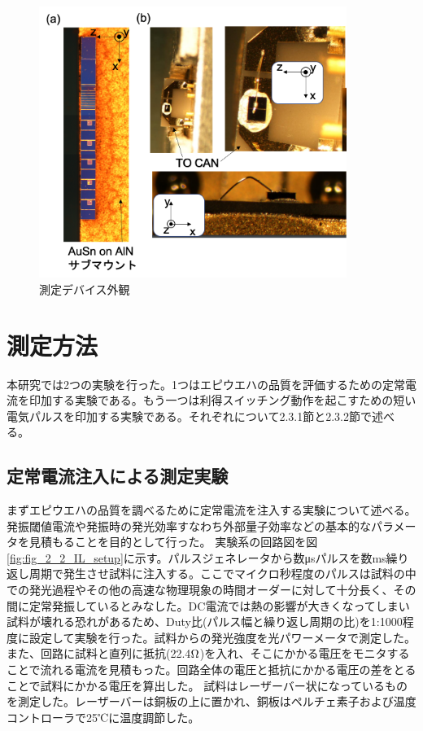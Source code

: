 \begin{figure}[h]%
	\centering
	\includegraphics[width=10cm]{figure/fig_2_1_mount.png}
	\caption{測定デバイス外観}
	\label{fig:fig_2_1_mount}
\end{figure}

\clearpage
\section{測定方法}%
本研究では2つの実験を行った。1つはエピウエハの品質を評価するための定常電流を印加する実験である。もう一つは利得スイッチング動作を起こすための短い電気パルスを印加する実験である。それぞれについて2.3.1節と2.3.2節で述べる。
\subsection{定常電流注入による測定実験}%
まずエピウエハの品質を調べるために定常電流を注入する実験について述べる。発振閾値電流や発振時の発光効率すなわち外部量子効率などの基本的なパラメータを見積もることを目的として行った。
実験系の回路図を図\ref{fig:fig_2_2_IL_setup}に示す。パルスジェネレータから数\si{\micro s}パルスを数ms繰り返し周期で発生させ試料に注入する。ここでマイクロ秒程度のパルスは試料の中での発光過程やその他の高速な物理現象の時間オーダーに対して十分長く、その間に定常発振しているとみなした。DC電流では熱の影響が大きくなってしまい試料が壊れる恐れがあるため、Duty比(パルス幅と繰り返し周期の比)を1:1000程度に設定して実験を行った。試料からの発光強度を光パワーメータで測定した。また、回路に試料と直列に抵抗(22.4$\rm{\Omega}$)を入れ、そこにかかる電圧をモニタすることで流れる電流を見積もった。回路全体の電圧と抵抗にかかる電圧の差をとることで試料にかかる電圧を算出した。
試料はレーザーバー状になっているものを測定した。レーザーバーは銅板の上に置かれ、銅板はペルチェ素子および温度コントローラで25℃に温度調節した。

